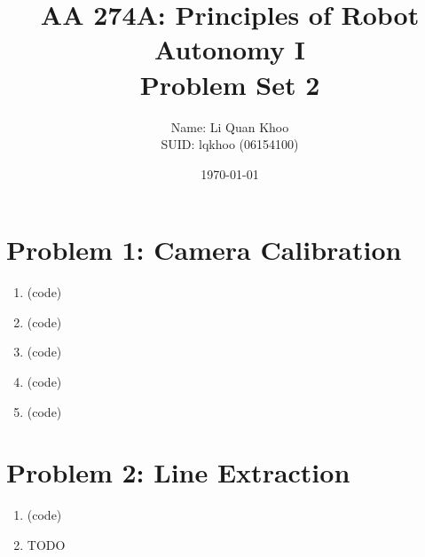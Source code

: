 \documentclass{article}
\title{AA 274A: Principles of Robot Autonomy I \\ Problem Set 2}
\author{Name: Li Quan Khoo     \\ SUID: lqkhoo (06154100)}
\date{\today}
\begin{document}
\maketitle
\pagestyle{fancy} 

\section*{Problem 1: Camera Calibration}
\begin{enumerate}[label=(\roman*)]
\item %
(code)

\item %
(code)

\item %
(code)

\item %
(code)

\item %
(code)

\end{enumerate}


\section*{Problem 2: Line Extraction}
\begin{enumerate}[label=(\roman*)]
\item %
(code)

\item %
TODO

\end{enumerate}
\end{document}
